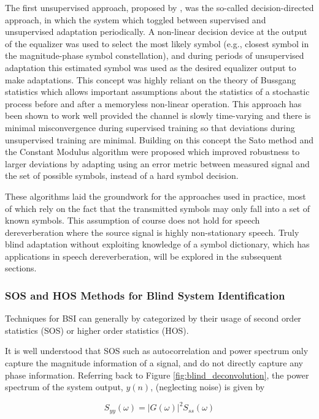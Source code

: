 The first unsupervised approach, proposed by \cite{lucky1965automatic}, was the so-called decision-directed approach, in which the system which toggled between supervised and unsupervised adaptation periodically. A non-linear decision device at the output of the equalizer was used to select the most likely symbol (e.g., closest symbol in the magnitude-phase symbol constellation), and during periods of unsupervised adaptation this estimated symbol was used as the desired equalizer output to make adaptations. This concept was highly reliant on the theory of Bussgang statistics which allows important assumptions about the statistics of a stochastic process before and after a memoryless non-linear operation. This approach has been shown to work well provided the channel is slowly time-varying and there is minimal misconvergence during supervised training so that deviations during unsupervised training are minimal. Building on this concept the Sato method \citep{sato1975method} and the Constant Modulus algorithm \citep{godard1980self} were proposed which improved robustness to larger deviations by adapting using an error metric between measured signal and the set of possible symbols, instead of a hard symbol decision. 

These algorithms laid the groundwork for the approaches used in practice, most of which rely on the fact that the transmitted symbols may only fall into a set of known symbols. This assumption of course does not hold for speech dereverberation where the source signal is highly non-stationary speech. Truly blind adaptation without exploiting knowledge of a symbol dictionary, which has applications in speech dereverberation, will be explored in the subsequent sections.

\subsubsection{SOS and HOS Methods for Blind System Identification}

Techniques for BSI can generally by categorized by their usage of second order statistics (SOS) or higher order statistics (HOS). 

It is well understood that SOS such as autocorrelation and power spectrum only capture the magnitude information of a signal, and do not directly capture any phase information. Referring back to Figure \ref{fig:blind_deconvolution}, the power spectrum of the system output, $y(n)$, (neglecting noise) is given by

\begin{equation}
	S_{yy}(\omega) = |G(\omega)|^2 S_{ss}(\omega)
\end{equation}

